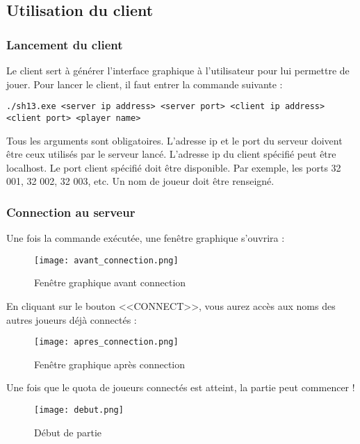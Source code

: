 \subsection{Utilisation du client}

\subsubsection{Lancement du client}

Le client sert à générer l'interface graphique à l'utilisateur pour lui permettre de jouer. Pour lancer le client, il faut entrer la commande suivante :
\begin{verbatim}
./sh13.exe <server ip address> <server port> <client ip address> <client port> <player name>
\end{verbatim}
Tous les arguments sont obligatoires. L'adresse ip et le port du serveur doivent être ceux utilisés par le serveur lancé. L'adresse ip du client spécifié peut être localhost. Le port client spécifié doit être disponible. Par exemple, les ports 32 001, 32 002, 32 003, etc. Un nom de joueur doit être renseigné.

\subsubsection{Connection au serveur}

Une fois la commande exécutée, une fenêtre graphique s'ouvrira :
\begin{figure}[H]
    \begin{center}
        \texttt{[image: avant\_connection.png]}
    \end{center}
     \caption{Fenêtre graphique avant connection}
    \label{fig:avant_connection}
\end{figure}
En cliquant sur le bouton <<CONNECT>>, vous aurez accès aux noms des autres joueurs déjà connectés :
\begin{figure}[H]
    \begin{center}
        \texttt{[image: apres\_connection.png]}
    \end{center}
   	 \caption{Fenêtre graphique après connection}
    \label{fig:après_connection}
\end{figure}
Une fois que le quota de joueurs connectés est atteint, la partie peut commencer !
\begin{figure}[H]
    \begin{center}
        \texttt{[image: debut.png]}
    \end{center}
     \caption{Début de partie}
    \label{fig:debut}
\end{figure}

